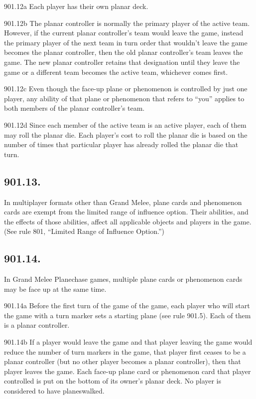 901.12a Each player has their own planar deck.

901.12b The planar controller is normally the primary player of the active team. However, if the current planar controller’s team would leave the game, instead the primary player of the next team in turn order that wouldn’t leave the game becomes the planar controller, then the old planar controller’s team leaves the game. The new planar controller retains that designation until they leave the game or a different team becomes the active team, whichever comes first.

901.12c Even though the face-up plane or phenomenon is controlled by just one player, any ability of that plane or phenomenon that refers to “you” applies to both members of the planar controller’s team.

901.12d Since each member of the active team is an active player, each of them may roll the planar die. Each player’s cost to roll the planar die is based on the number of times that particular player has already rolled the planar die that turn.

\subsection*{901.13.}
In multiplayer formats other than Grand Melee, plane cards and phenomenon cards are exempt from the limited range of influence option. Their abilities, and the effects of those abilities, affect all applicable objects and players in the game. (See rule 801, “Limited Range of Influence Option.”)

\subsection*{901.14.}
In Grand Melee Planechase games, multiple plane cards or phenomenon cards may be face up at the same time.

901.14a Before the first turn of the game of the game, each player who will start the game with a turn marker sets a starting plane (see rule 901.5). Each of them is a planar controller.

901.14b If a player would leave the game and that player leaving the game would reduce the number of turn markers in the game, that player first ceases to be a planar controller (but no other player becomes a planar controller), then that player leaves the game. Each face-up plane card or phenomenon card that player controlled is put on the bottom of its owner’s planar deck. No player is considered to have planeswalked.

